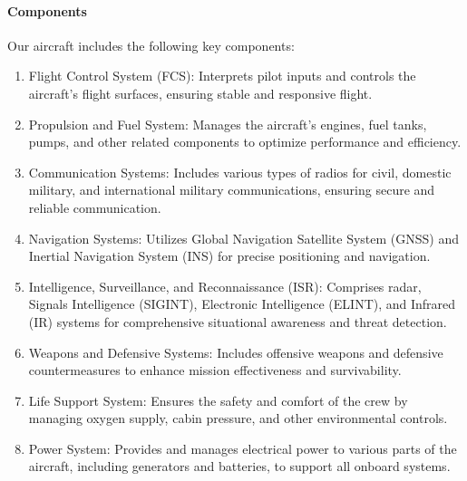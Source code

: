 \documentclass[a4paper,11pt]{article}
\begin{document}
	\paragraph{Components}
	Our aircraft includes the following key components:
	\begin{enumerate}[label=C\arabic*)]
		\item Flight Control System (FCS): Interprets pilot inputs and controls the aircraft's flight surfaces, ensuring stable and responsive flight.
		\item Propulsion and Fuel System: Manages the aircraft's engines, fuel tanks, pumps, and other related components to optimize performance and efficiency.
		\item Communication Systems: Includes various types of radios for civil, domestic military, and international military communications, ensuring secure and reliable communication.
		\item Navigation Systems: Utilizes Global Navigation Satellite System (GNSS) and Inertial Navigation System (INS) for precise positioning and navigation.
		\item Intelligence, Surveillance, and Reconnaissance (ISR): Comprises radar, Signals Intelligence (SIGINT), Electronic Intelligence (ELINT), and Infrared (IR) systems for comprehensive situational awareness and threat detection.
		\item Weapons and Defensive Systems: Includes offensive weapons and defensive countermeasures to enhance mission effectiveness and survivability.
		\item Life Support System: Ensures the safety and comfort of the crew by managing oxygen supply, cabin pressure, and other environmental controls.
		\item Power System: Provides and manages electrical power to various parts of the aircraft, including generators and batteries, to support all onboard systems.
	\end{enumerate}
\end{document}

